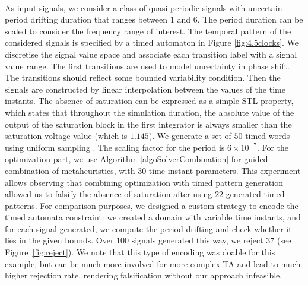 ~\\
As input signals, we consider a class of quasi-periodic signals with uncertain period drifting duration that ranges between $1$ and $6$. The period duration can be scaled to consider the frequency range of interest. The temporal pattern of the considered signals is specified by a timed automaton in Figure \ref{fig:4.5clocks}. We discretise the signal value space and associate each transition label with a signal value range. The first transitions are used to model uncertainty in phase shift. The transitions should reflect some bounded variability condition. Then the signals are constructed by linear interpolation between the values of the time instants. The absence of saturation can be expressed as a simple STL property, which states that throughout the simulation duration, the absolute value of the output of the saturation block in the first integrator is always smaller than the saturation voltage value (which is $1.145$). We generate a set of $50$ timed words using uniform sampling \cite{BBBK16}. The scaling factor for the period is $6 \times 10^{-7}$. For the optimization part, we use Algorithm \ref{algoSolverCombination} for guided  combination of metaheuristics, with $30$ time instant parameters. This experiment allows observing that combining optimization with timed pattern generation allowed us to falsify the absence of saturation after using $22$ generated timed patterns. For comparison purposes, we designed a custom strategy to encode the timed automata constraint: we created a domain with variable time instants, and for each signal generated, we compute the period drifting and check whether it lies in the given bounds. Over $100$ signals generated this way, we reject $37$ (see Figure~\ref{fig:reject}). We note that this type of encoding was doable for this example, but can be much more involved for more complex TA and lead to much higher rejection rate, rendering falsification without our approach infeasible. 
